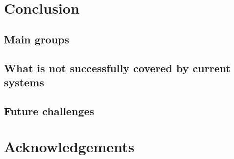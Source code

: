\documentclass[a4paper]{article}
\begin{document}
\section{Conclusion}
\label{sect|conclusion}

\subsection{Main groups}

\subsection{What is not successfully covered by current systems}

\subsection{Future challenges}
\label{sect|future-challenges}

\section*{Acknowledgements} 




\end{document}
